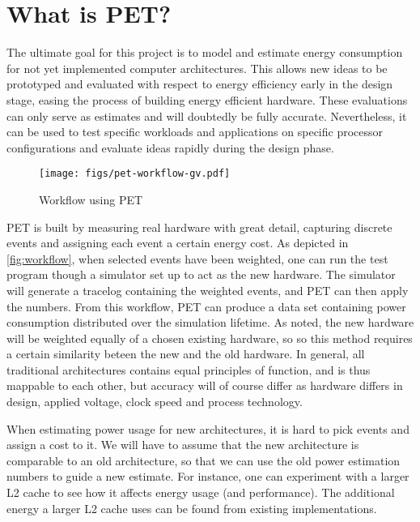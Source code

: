 \section{What is PET?}

The ultimate goal for this project is to model and estimate energy consumption
for not yet implemented computer architectures. This allows new ideas to be prototyped
and evaluated with respect to energy efficiency early in the design stage,
easing the process of building energy efficient hardware. These evaluations can
only serve as estimates and will doubtedly be fully accurate. Nevertheless, it
can be used to test specific workloads and applications on specific processor
configurations and evaluate ideas rapidly during the design phase.

\begin{figure}
    \texttt{[image: figs/pet-workflow-gv.pdf]}
    \caption{Workflow using PET}
    \label{fig:workflow}
\end{figure}

PET is built by measuring real hardware with great detail, capturing discrete
events and assigning each event a certain energy cost. As depicted in
\autoref{fig:workflow}, when selected events have been weighted, one can run the
test program though a simulator set up to act as the new hardware. The simulator
will generate a tracelog containing the weighted events, and PET can then apply
the numbers. From this workflow, PET can produce a data set containing power
consumption distributed over the simulation lifetime. As noted, the new hardware
will be weighted equally of a chosen existing hardware, so so this method
requires a certain similarity beteen the new and the old hardware. In general,
all traditional architectures contains equal principles of function, and is thus
mappable to each other, but accuracy will of course differ as hardware differs
in design, applied voltage, clock speed and process technology.

When estimating power usage for new architectures, it is hard to pick events and
assign a cost to it. We will have to assume that the new architecture is
comparable to an old architecture, so that we can use the old power estimation
numbers to guide a new estimate. For instance, one can experiment with a
larger L2 cache to see how it affects energy usage (and performance). The
additional energy a larger L2 cache uses can be found from existing
implementations.
